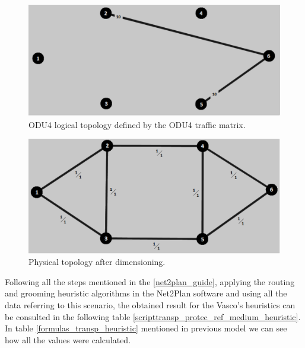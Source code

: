 \begin{figure}[H]
\centering
\includegraphics[width=13cm]{sdf/heuristic/transparent_protection/figures/logical_topology_odu4_medium}
\caption{ODU4 logical topology defined by the ODU4 traffic matrix.}
\label{logical_ODU4_protection_ref_medium_heuristic_transparent}
\end{figure}

\begin{figure}[H]
\centering
\includegraphics[width=13cm]{sdf/heuristic/transparent_protection/figures/physical_topology}
\caption{Physical topology after dimensioning.}
\label{physical_topology_protection_ref_medium_heuristic_transparent}
\end{figure}

Following all the steps mentioned in the \ref{net2plan_guide}, applying the routing and grooming heuristic algorithms in the Net2Plan software and using all the data referring to this scenario, the obtained result for the Vasco's heuristics can be consulted in the following table \ref{scripttransp_protec_ref_medium_heuristic}. In table \ref{formulas_transp_heuristic} mentioned in previous model we can see how all the values were calculated. \\

